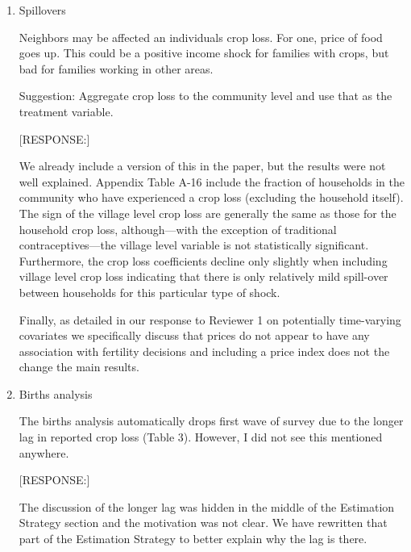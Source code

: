 \documentclass[letterpaper,12pt]{article}
\begin{document}
\begin{enumerate}
\item Spillovers

Neighbors may be affected an individuals crop loss. For one, price of
food goes up. This could be a positive income shock for families with
crops, but bad for families working in other areas.

Suggestion: Aggregate crop loss to the community level and use that as
the treatment variable.


[RESPONSE:]

We already include a version of this in the paper, but the 
results were not well explained.
Appendix Table A-16 include the fraction of households in the community 
who have experienced a crop loss (excluding the household itself).
The sign of the village level crop loss are generally the same as
those for the household crop loss, although---with the exception
of traditional contraceptives---the village level variable is not
statistically significant.
Furthermore, the crop loss coefficients decline only slightly
when including village level crop loss indicating that there is
only relatively mild spill-over between households for this
particular type of shock.

Finally, as detailed in our response to Reviewer 1 on potentially 
time-varying covariates we specifically discuss that prices do not appear 
to have any association with fertility decisions and including 
a price index does not the change the main results.

\item Births analysis

The births analysis automatically drops first wave of survey due to the
longer lag in reported crop loss (Table 3). However, I did not see this
mentioned anywhere.

[RESPONSE:]

The discussion of the longer lag was hidden in the middle of the 
Estimation Strategy section and the motivation was not clear.
We have rewritten that part of the Estimation Strategy to better
explain why the lag is there.

\end{enumerate}


\newpage


\end{document}
